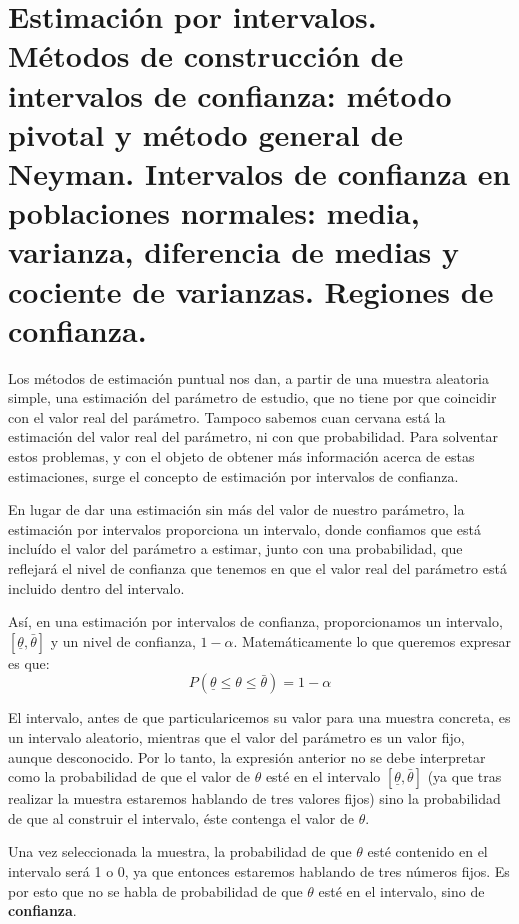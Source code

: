 \chapter[Estimaci\'on por intervalos.]{Estimaci\'on por intervalos. \\
\normalsize M\'etodos de construcci\'on de intervalos de confianza: m\'etodo pivotal y m\'etodo general de Neyman. Intervalos de confianza en poblaciones normales: media, varianza, diferencia de medias y cociente de varianzas. Regiones de confianza.}


Los m\'etodos de estimaci\'on puntual nos dan, a partir de una muestra aleatoria simple, una estimaci\'on del par\'ametro de estudio, que no tiene por que coincidir con el valor real del par\'ametro. Tampoco sabemos cuan cervana est\'a la estimaci\'on del valor real del par\'ametro, ni con que probabilidad. Para solventar estos problemas, y con el objeto de obtener m\'as informaci\'on acerca de estas estimaciones, surge el concepto de estimaci\'on por intervalos de confianza.

En lugar de dar una estimaci\'on sin m\'as del valor de nuestro par\'ametro, la estimaci\'on por intervalos proporciona un intervalo, donde confiamos que est\'a inclu\'ido el valor del par\'ametro a estimar, junto con una probabilidad, que reflejar\'a el nivel de confianza que tenemos en que el valor real del par\'ametro est\'a incluido dentro del intervalo.

As\'i, en una estimaci\'on por intervalos de confianza, proporcionamos un intervalo, $[\underline{\theta}, \bar{\theta}]$ y un nivel de confianza, $1-\alpha$. Matem\'aticamente lo que queremos expresar es que:
\begin{equation*}
P(\underline{\theta}\leq\theta\leq\bar{\theta})=1-\alpha
\end{equation*}

El intervalo, antes de que particularicemos su valor para una muestra concreta, es un intervalo aleatorio, mientras que el valor del par\'ametro es un valor fijo, aunque desconocido. Por lo tanto, la expresi\'on anterior no se debe interpretar como la probabilidad de que el valor de $\theta$ est\'e en el intervalo $[\underline{\theta}, \bar{\theta}]$ (ya que tras realizar la muestra estaremos hablando de tres valores fijos) sino la probabilidad de que al construir el intervalo, \'este contenga el valor de $\theta$.

Una vez seleccionada la muestra, la probabilidad de que $\theta$ est\'e contenido en el intervalo ser\'a 1 o 0, ya que entonces estaremos hablando de tres n\'umeros fijos. Es por esto que no se habla de probabilidad de que $\theta$ est\'e en el intervalo, sino de \textbf{confianza}.

